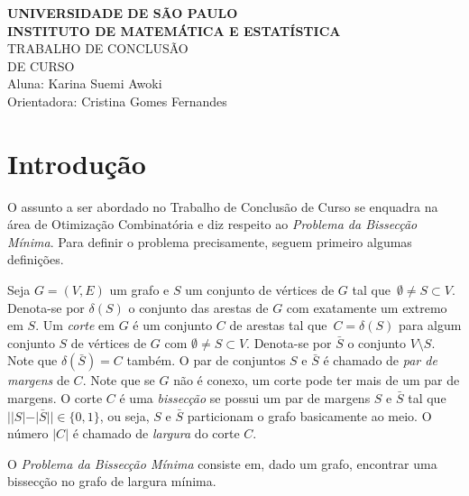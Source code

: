 \documentclass[a4paper,12pt]{article}
\begin{document}
\begin{center}
   {\large \textbf{UNIVERSIDADE DE SÃO PAULO}} \\[1.4cm]
   
   {\large \textbf{INSTITUTO DE MATEMÁTICA E ESTATÍSTICA}}\\[4.2cm]
   
   {\Huge TRABALHO DE CONCLUSÃO }\\[0.3cm]
   {\Huge DE CURSO }\\[9cm]
   
   {\large { Aluna: Karina Suemi Awoki}}\\[0.3cm]
   
   {\large { Orientadora: Cristina Gomes Fernandes}}
   

\end{center}

\newpage


\section{Introdução}

O assunto a ser abordado no Trabalho de Conclusão de Curso se
enquadra na área de Otimização Combinatória e diz respeito ao 
\emph{Problema da Bissecção Mínima}. Para definir o problema 
precisamente, seguem primeiro algumas definições. 

Seja $G=(V,E)$ um grafo e $S$ um conjunto de vértices de $G$ tal 
que~${\emptyset \neq S \subset V}$. 
Denota-se por $\delta(S)$ o conjunto das arestas de $G$ com 
exatamente um extremo em $S$. Um \emph{corte} em $G$ é um conjunto
$C$ de arestas tal que~${C = \delta(S)}$ para algum conjunto $S$ 
de vértices de $G$ com $\emptyset \neq S \subset V$. 
Denota-se por $\bar{S}$ o conjunto $V \setminus S$. 
Note que $\delta(\bar{S}) = C$ também. 
O par de conjuntos $S$ e $\bar{S}$ é chamado de 
\emph{par de margens} de $C$. 
Note que se $G$ não é conexo, um corte pode ter mais de um par de 
margens. 
O corte $C$ é uma \emph{bissecção} se possui um par de margens $S$ 
e $\bar{S}$ tal que $||S|- |\bar{S}|| \in \{0,1\}$, ou seja, $S$ e 
$\bar{S}$ particionam o grafo basicamente ao meio. 
O número $|C|$ é chamado de \emph{largura} do corte $C$. 

O \emph{Problema da Bissecção Mínima} consiste em, dado um grafo, 
encontrar uma bissecção no grafo de largura mínima.
\end{document}
